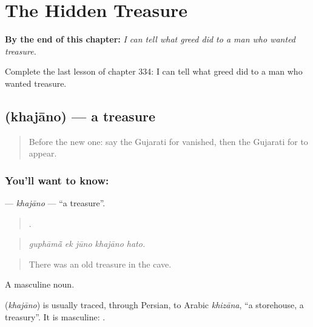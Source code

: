 
\chapter{The Hidden Treasure}
\label{ch:gu-the-hidden-treasure}

\begin{chapteropening}
\textbf{By the end of this chapter:} \emph{I can tell what greed did to a man who wanted treasure.}

Complete the last lesson of chapter 334: I can tell what greed did to a man who wanted treasure.
\end{chapteropening}

\section[\texorpdfstring{\gu{ખજાનો} (khajāno)}{ખજાનો (khajāno)}]{ (khajāno) — a treasure}

\label{lesson:GU-C334-khajano}



\begin{quote}
Before the new one: say the Gujarati for vanished, then the Gujarati for to appear.
\end{quote}

\subsection*{You'll want to know: }
\textbf{} — \emph{khajāno} — \textquotedblleft{}a treasure\textquotedblright{}.

\begin{quote}
    .
\end{quote}

\begin{quote}
\emph{guphāmā̃ ek jūno khajāno hato.}
\end{quote}

\begin{quote}
There was an old treasure in the cave.
\end{quote}

A masculine noun.

\begin{cousinweb}
\textbf{} (\emph{khajāno}) is usually traced, through Persian, to Arabic \emph{khizāna}, \textquotedblleft{}a storehouse, a treasury\textquotedblright{}. It is masculine: \textbf{ }.
\end{cousinweb}

